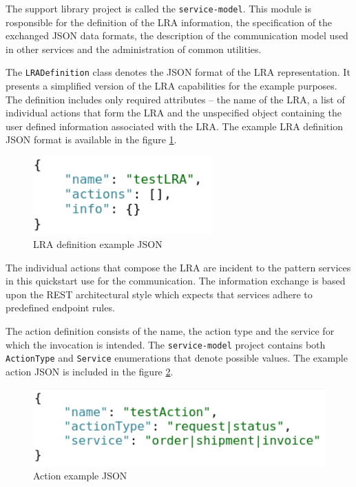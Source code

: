 \documentclass[oneside,
  digital, %
  table,   %
  nolof,     %
  nolot,     %
]{fithesis3}
\begin{document}
The support library project is called the \texttt{service-model}. This module is rosponsible for the definition of the LRA information, the specification of the exchanged JSON data formats, the description of the communication model used in other services and the administration of common utilities.

The \texttt{LRADefinition} class denotes the JSON format of the LRA representation. It presents a simplified version of the LRA capabilities for the example purposes. The definition includes only required attributes -- the name of the LRA, a list of individual actions that form the LRA and the unspecified object containing the user defined information associated with the LRA. The example LRA definition JSON format is available in the figure \ref{fig:lra-json}.

\begin{figure}[h]
    \begin{center}
        \includegraphics[height=30mm]{images/LRADefinition.png}
    \end{center}
    \caption{LRA definition example JSON}
    \label{fig:lra-json}
\end{figure}

The individual actions that compose the LRA are incident to the pattern services in this quickstart use for the communication. The information exchange is based upon the REST architectural style which expects that services adhere to predefined endpoint rules. 

The action definition consists of the name, the action type and the service for which the invocation is intended. The \texttt{service-model} project contains both \texttt{ActionType} and \texttt{Service} enumerations that denote possible values. The example action JSON is included in the figure \ref{fig:action-json}.

\begin{figure}[h]
    \begin{center}
        \includegraphics[height=30mm]{images/actionJSON.png}
    \end{center}
    \caption{Action example JSON}
    \label{fig:action-json}
\end{figure}
\end{document}

